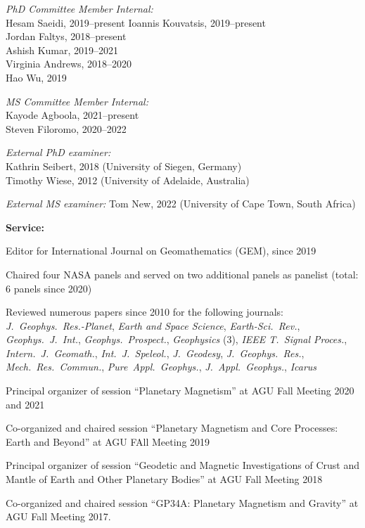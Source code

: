 \documentclass[10pt]{article}
\begin{document}
\spcp
\emph{PhD Committee Member Internal:}\\
Hesam Saeidi, 2019--present
Ioannis Kouvatsis, 2019--present\\
Jordan Faltys, 2018--present \\
Ashish Kumar, 2019--2021\\
Virginia Andrews, 2018--2020\\
Hao Wu, 2019

\spcp
\emph{MS Committee Member Internal:}\\
Kayode Agboola, 2021--present\\
Steven Filoromo, 2020--2022 

\spcp
\emph{External PhD examiner:}\\
Kathrin Seibert, 2018 (University of Siegen, Germany)\\
Timothy Wiese, 2012 (University of Adelaide, Australia)

\emph{External MS examiner:}
Tom New, 2022 (University of Cape Town, South Africa)


\clearpage
\textbf{\tsize Service:}

\spcp
Editor for International Journal on Geomathematics (GEM), since 2019

\spcp
Chaired four NASA panels and served on two
additional panels as panelist (total: 6 panels since 2020)

\spcp
Reviewed numerous papers since 2010 for the following journals:\\
\emph{J.~Geophys.~Res.-Planet},
\emph{Earth and Space Science},
\emph{Earth-Sci.~Rev.},
\emph{Geophys.~J.~Int.},
\emph{Geophys.~Prospect.},
\emph{Geophysics} (3),
\emph{IEEE T.~Signal Proces.},
\emph{Intern.~J.~Geomath.},
\emph{Int.~J.~Speleol.},
\emph{J.~Geodesy},
\emph{J.~Geophys.~Res.},
\emph{Mech.~Res.~Commun.},
\emph{Pure~Appl.~Geophys.},
\emph{J.~Appl.~Geophys.},
\emph{Icarus}

\spcp
Principal organizer of session ``Planetary Magnetism'' at AGU Fall Meeting 2020 and 2021

\spcp Co-organized and chaired session ``Planetary Magnetism
and Core Processes: Earth and Beyond'' at AGU FAll Meeting 2019

\spcp Principal organizer of session ``Geodetic and Magnetic
Investigations of Crust and Mantle of Earth and Other Planetary
Bodies'' at AGU Fall Meeting 2018

\spcp
Co-organized and chaired session
``GP34A: Planetary Magnetism and Gravity''
at AGU Fall Meeting 2017.
          
\end{document}
